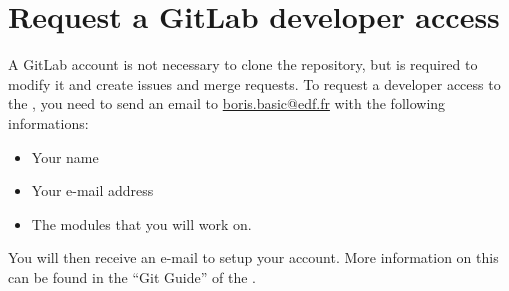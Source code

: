 \section{Request a GitLab developer access}
%
A GitLab account is not necessary to clone the repository, but is required to
modify it and create issues and merge requests. To request a developer access
to the \telemacsystem, you need to send an email to \url{boris.basic@edf.fr}
with the following informations:
\begin{itemize}
\item Your name
\item Your e-mail address
\item The \telemacsystem modules that you will work on.
\end{itemize}

You will then receive an e-mail to setup your account. More information on this
can be found in the ``Git Guide'' of the \telemacsystem.

